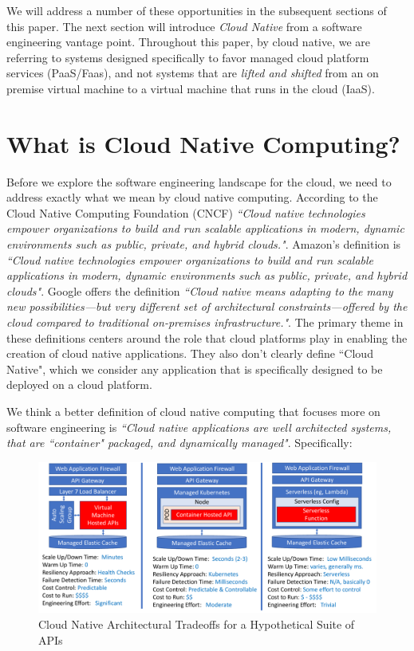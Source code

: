\documentclass[conference]{IEEEtran}
\begin{document}
We will address a number of these opportunities in the subsequent sections of this paper.  The next section will introduce \textit{Cloud Native} from a software engineering vantage point. Throughout this paper, by cloud native, we are referring to systems designed specifically to favor managed cloud platform services (PaaS/Faas)\cite{albuquerque2017function}, and not systems that are \textit{lifted and shifted}\cite{CloudMigration2017} from an on premise virtual machine to a virtual machine that runs in the cloud (IaaS). 


\section{What is Cloud Native Computing?}
\label{sec:WhatIsCNF}
Before we explore the software engineering landscape for the cloud, we need to address exactly what we mean by cloud native computing.  According to the Cloud Native Computing Foundation (CNCF)\cite{CNCFHome}  \textit{``Cloud native technologies empower organizations to build and run scalable applications in modern, dynamic environments such as public, private, and hybrid clouds."}.  Amazon's definition is \textit{``Cloud native technologies empower organizations to build and run scalable applications in modern, dynamic environments such as public, private, and hybrid clouds"}. Google offers the definition \textit{``Cloud native means adapting to the many new possibilities—but very different set of architectural constraints—offered by the cloud compared to traditional on-premises infrastructure."}.  The primary theme in these definitions centers around the role that cloud platforms play in enabling the creation of cloud native applications.  They also don't clearly define ``Cloud Native", which we consider any application that is specifically designed to be deployed on a cloud platform. 

We think a better definition of cloud native computing that focuses more on  software engineering is \textit{``Cloud native applications are well architected systems, that are ``container" packaged, and dynamically managed"}. Specifically:

\begin{figure}[t]
	\includegraphics[width=\textwidth]{images/APIPackageTradoffs}	
	\caption{Cloud Native Architectural Tradeoffs for a Hypothetical Suite of APIs}
	\label{fig:CloudQATradeoffs}
\end{figure}
\end{document}
